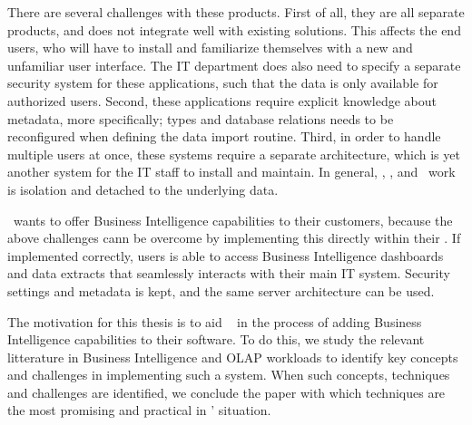 There are several challenges with these products. First of all, they are all separate products, and does not integrate well with existing solutions. This affects the end users, who will have to install and familiarize themselves with a new and unfamiliar user interface. The IT department does also need to specify a separate security system for these applications, such that the data is only available for authorized users. Second, these applications require explicit knowledge about metadata, more specifically; types and database relations needs to be reconfigured when defining the data import routine. Third, in order to handle multiple users at once, these systems require a separate architecture, which is yet another system for the IT staff to install and maintain. In general, \qlikview, \tableau, and \powerpivot~work is isolation and detached to the underlying data.

\genus~wants to offer Business Intelligence capabilities to their customers, because the above challenges cann be overcome by implementing this directly within their \genusSoftware. If implemented correctly, users is able to access Business Intelligence dashboards and data extracts that seamlessly interacts with their main IT system. Security settings and metadata is kept, and the same server architecture can be used.

The motivation for this thesis is to aid \genus~ in the process of adding Business Intelligence capabilities to their software. To do this, we study the relevant litterature in Business Intelligence and OLAP workloads to identify key concepts and challenges in implementing such a system. When such concepts, techniques and challenges are identified, we conclude the paper with which techniques are the most promising and practical in \genus' situation.

